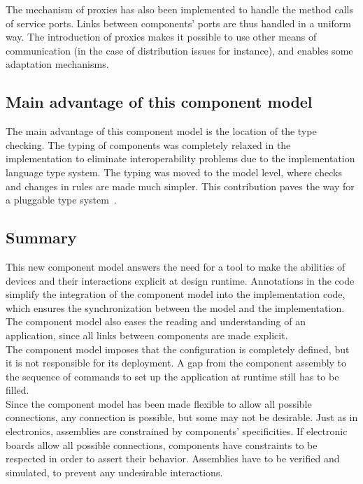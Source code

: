 The mechanism of proxies has also been implemented to handle the method calls of service ports. Links between components' ports are thus handled in a uniform way. The introduction of proxies makes it possible to use other means of communication (in the case of distribution issues for instance), and enables some adaptation mechanisms.\\

\subsection{Main advantage of this component model}

The main advantage of this component model is the location of the type checking. The typing of components was completely relaxed in the implementation to eliminate interoperability problems due to the implementation language type system. The typing was moved to the model level, where checks and changes in rules are made much simpler. This contribution paves the way for a pluggable type system~\cite{PapiACPE2008,Bracha:2004}.\\


\subsection{Summary}

This new component model answers the need for a tool to make the abilities of devices and their interactions explicit at design runtime. Annotations in the code simplify the integration of the component model into the implementation code, which ensures the synchronization between the model and the implementation. The component model also eases the reading and understanding of an application, since all links between components are made explicit.\\

The component model imposes that the configuration is completely defined, but it is not responsible for its deployment. A gap from the component assembly to the sequence of commands to set up the application at runtime still has to be filled.\\
Since the component model has been made flexible to allow all possible connections, any connection is possible, but some may not be desirable. Just as in electronics, assemblies are constrained by components' specificities. If electronic boards allow all possible connections, components have constraints to be respected in order to assert their behavior. Assemblies have to be verified and simulated, to prevent any undesirable interactions.\\

